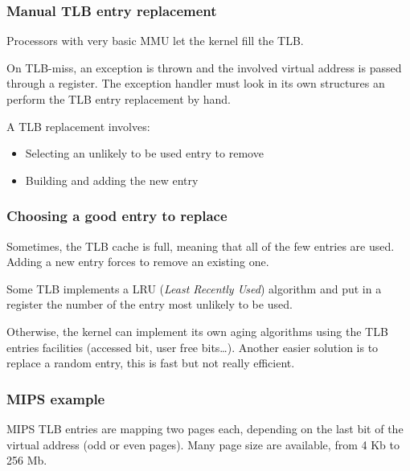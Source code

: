 
\begin{frame}
  \frametitle{Manual TLB entry replacement}

  Processors with very basic MMU let the kernel fill the TLB.

  \-

  On TLB-miss, an exception is thrown and the involved virtual address
  is passed through a register. The exception handler must look in its
  own structures an perform the TLB entry replacement by hand.

  \-

  A TLB replacement involves:

  \begin{itemize}
  \item
    Selecting an unlikely to be used entry to remove
  \item
    Building and adding the new entry
  \end{itemize}

\end{frame}


\begin{frame}
  \frametitle{Choosing a good entry to replace}

  Sometimes, the TLB cache is full, meaning that all of the few
  entries are used. Adding a new entry forces to remove an existing
  one.

  \-

  Some TLB implements a LRU (\emph{Least Recently Used}) algorithm and
  put in a register the number of the entry most unlikely to be used.

  \-

  Otherwise, the kernel can implement its own aging algorithms using
  the TLB entries facilities (accessed bit, user free
  bits\ldots). Another easier solution is to replace a random entry,
  this is fast but not really efficient.

\end{frame}


\begin{frame}
  \frametitle{MIPS example}

  \begin{center}
  \end{center}

  MIPS TLB entries are mapping two pages each, depending on the last
  bit of the virtual address (odd or even pages). Many page size are
  available, from 4 Kb to 256 Mb.

\end{frame}


